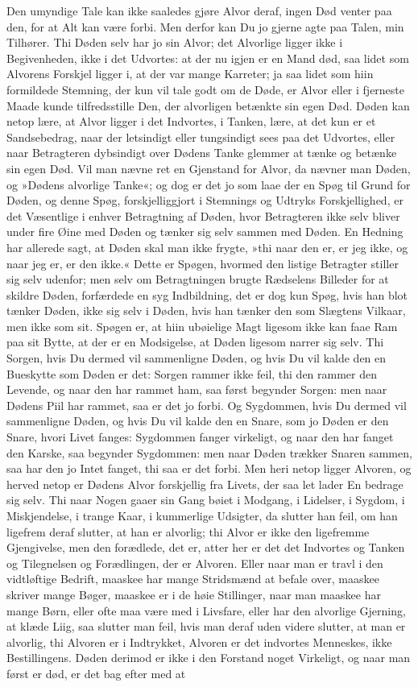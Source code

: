 \documentclass[12pt,a4paper]{article}
\begin{document}
Den umyndige Tale kan ikke saaledes gjøre Alvor deraf, ingen Død venter paa den, for at Alt kan være forbi. Men derfor kan Du jo gjerne agte paa Talen, min Tilhører. Thi Døden selv har jo sin Alvor; det Alvorlige ligger ikke i Begivenheden, ikke i det Udvortes: at der nu igjen er en Mand død, saa lidet som Alvorens Forskjel ligger i, at der var mange Karreter; ja saa lidet som hiin formildede Stemning, der kun vil tale godt om de Døde, er Alvor eller i fjerneste Maade kunde tilfredsstille Den, der alvorligen betænkte sin egen Død. Døden kan netop lære, at Alvor ligger i det Indvortes, i Tanken, lære, at det kun er et Sandsebedrag, naar der letsindigt eller tungsindigt sees paa det Udvortes, eller naar Betragteren dybsindigt over Dødens Tanke glemmer at tænke og betænke sin egen Død. Vil man nævne ret en Gjenstand for Alvor, da nævner man Døden, og »Dødens alvorlige Tanke«; og dog er det jo som laae der en Spøg til Grund for Døden, og denne Spøg, forskjelliggjort i Stemnings og Udtryks Forskjellighed, er det Væsentlige i enhver Betragtning af Døden, hvor Betragteren ikke selv bliver under fire Øine med Døden og tænker sig selv sammen med Døden. En Hedning har allerede sagt, at Døden skal man ikke frygte, »thi naar den er, er jeg ikke, og naar jeg er, er den ikke.« Dette er Spøgen, hvormed den listige Betragter stiller sig selv udenfor; men selv om Betragtningen brugte Rædselens Billeder for at skildre Døden, forfærdede en syg Indbildning, det er dog kun Spøg, hvis han blot tænker Døden, ikke sig selv i Døden, hvis han tænker den som Slægtens Vilkaar, men ikke som sit. Spøgen er, at hiin ubøielige Magt ligesom ikke kan faae Ram paa sit Bytte, at der er en Modsigelse, at Døden ligesom narrer sig selv. Thi Sorgen, hvis Du dermed vil sammenligne Døden, og hvis Du vil kalde den en Bueskytte som Døden er det: Sorgen rammer ikke feil, thi den rammer den Levende, og naar den har rammet ham, saa først begynder Sorgen: men naar Dødens Piil har rammet, saa er det jo forbi. Og Sygdommen, hvis Du dermed vil sammenligne Døden, og hvis Du vil kalde den en Snare, som jo Døden er den Snare, hvori Livet fanges: Sygdommen fanger virkeligt, og naar den har fanget den Karske, saa begynder Sygdommen: men naar Døden trækker Snaren sammen, saa har den jo Intet fanget, thi saa er det forbi. Men heri netop ligger Alvoren, og herved netop er Dødens Alvor forskjellig fra Livets, der saa let lader En bedrage sig selv. Thi naar Nogen gaaer sin Gang bøiet i Modgang, i Lidelser, i Sygdom, i Miskjendelse, i trange Kaar, i kummerlige Udsigter, da slutter han feil, om han ligefrem deraf slutter, at han er alvorlig; thi Alvor er ikke den ligefremme Gjengivelse, men den forædlede, det er, atter her er det det Indvortes og Tanken og Tilegnelsen og Forædlingen, der er Alvoren. Eller naar man er travl i den vidtløftige Bedrift, maaskee har mange Stridsmænd at befale over, maaskee skriver mange Bøger, maaskee er i de høie Stillinger, naar man maaskee har mange Børn, eller ofte maa være med i Livsfare, eller har den alvorlige Gjerning, at klæde Liig, saa slutter man feil, hvis man deraf uden videre slutter, at man er alvorlig, thi Alvoren er i Indtrykket, Alvoren er det indvortes Menneskes, ikke Bestillingens. Døden derimod er ikke i den Forstand noget Virkeligt, og naar man først er død, er det bag efter med at 
\end{document}
